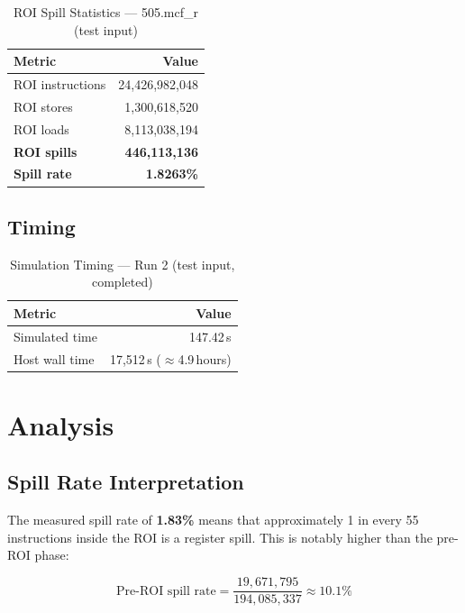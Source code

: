 \documentclass[conference]{IEEEtran}
\begin{document}
\begin{table}[H]
\centering
\caption{ROI Spill Statistics — 505.mcf\_r (test input)}
\label{tab:roi}
\begin{tabular}{lr}
\toprule
\textbf{Metric} & \textbf{Value} \\
\midrule
ROI instructions         & 24,426,982,048 \\
ROI stores               &  1,300,618,520 \\
ROI loads                &  8,113,038,194 \\
\midrule
\textbf{ROI spills}      & \textbf{446,113,136} \\
\textbf{Spill rate}      & \textbf{1.8263\%} \\
\bottomrule
\end{tabular}
\end{table}

\subsection{Timing}

\begin{table}[H]
\centering
\caption{Simulation Timing — Run 2 (test input, completed)}
\label{tab:timing}
\begin{tabular}{lr}
\toprule
\textbf{Metric} & \textbf{Value} \\
\midrule
Simulated time  & 147.42\,s \\
Host wall time  & 17,512\,s ($\approx$4.9\,hours) \\
\bottomrule
\end{tabular}
\end{table}

\section{Analysis}

\subsection{Spill Rate Interpretation}

The measured spill rate of \textbf{1.83\%} means that approximately
1 in every 55 instructions inside the ROI is a register spill.
This is notably higher than the pre-ROI phase:

\[
\text{Pre-ROI spill rate} = \frac{19{,}671{,}795}{194{,}085{,}337} \approx 10.1\%
\]
\end{document}
